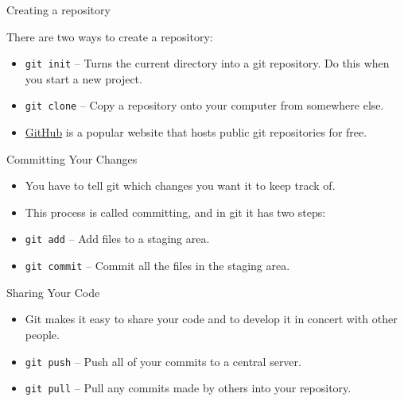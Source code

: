 \begin{frame}{Creating a repository}

 There are two ways to create a repository:

 \begin{itemize}

  \item \texttt{git init} -- Turns the current directory into a git repository.  
   Do this when you start a new project.

  \item \texttt{git clone} -- Copy a repository onto your computer from 
   somewhere else.

  \item \href{https://github.com/}{GitHub} is a popular website that hosts 
   public git repositories for free.

 \end{itemize}

\end{frame}

\begin{frame}{Committing Your Changes}

 \begin{itemize}

  \item You have to tell git which changes you want it to keep track of.

  \item This process is called committing, and in git it has two steps:

  \item \texttt{git add} -- Add files to a staging area.

  \item \texttt{git commit} -- Commit all the files in the staging area.

 \end{itemize}
 
\end{frame}

\begin{frame}{Sharing Your Code}

 \begin{itemize}

  \item Git makes it easy to share your code and to develop it in concert with 
   other people.

  \item \texttt{git push} -- Push all of your commits to a central server.

  \item \texttt{git pull} -- Pull any commits made by others into your 
   repository.

 \end{itemize}

\end{frame}
